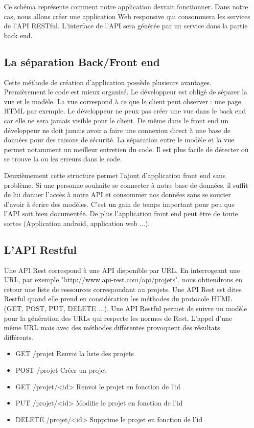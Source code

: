 \documentclass[12pt, twoside, openright]{report}
\begin{document}
Ce schéma représente comment notre application devrait fonctionner. Dans notre cas, nous allons créer une application Web responsive qui consommera les services de l'API RESTful. L'interface de l'API sera générée par un service dans la partie back end.

\subsection{La séparation Back/Front end}

Cette méthode de création d'application possède plusieurs avantages. Premièrement le code est mieux organisé. Le développeur est obligé de séparer la vue et le modèle. La vue correspond à ce que le client peut observer : une page HTML par exemple. Le développeur ne peux pas créer une vue dans le back end car elle ne sera jamais visible pour le client. De même dans le front end un développeur ne doit jamais avoir a faire une connexion direct à une base de données pour des raisons de sécurité. La séparation entre le modèle et la vue permet notamment un meilleur entretien du code. Il est plus facile de détecter où se trouve la ou les erreurs dans le code.  

Deuxièmement cette structure permet l'ajout d'application front end sans problème. Si une personne souhaite se connecter à notre base de données, il suffit de lui donner l'accès à notre API et consommer nos données sans se soucier d'avoir à écrire des modèles. C'est un gain de temps important pour peu que l'API soit bien documentée. De plus l'application front end peut être de toute sortes (Application android, application web ...).

\subsection{L'API Restful}

Une API Rest correspond à une API disponible par URL. En interrogeant une URL, par exemple "http://www.api-rest.com/api/projets", nous obtiendrons en retour une liste de ressources correspondant au projets. Une API Rest est dites Restful quand elle prend en considération les méthodes du protocole HTML (GET, POST, PUT, DELETE ...). Une API Restful permet de suivre un modèle pour la génération des URLs qui respecte les normes de Rest. L'appel d'une même URL mais avec des méthodes différentes provoquent des résultats différents.

\begin{itemize}
\item GET    /projet Renvoi la liste des projets
\item POST   /projet Créer un projet 
\item GET    /projet/<id> Renvoi le projet en fonction de l'id 
\item PUT    /projet/<id> Modifie le projet en fonction de l'id
\item DELETE /projet/<id> Supprime le projet en fonction de l'id
\end{itemize}
\end{document}

